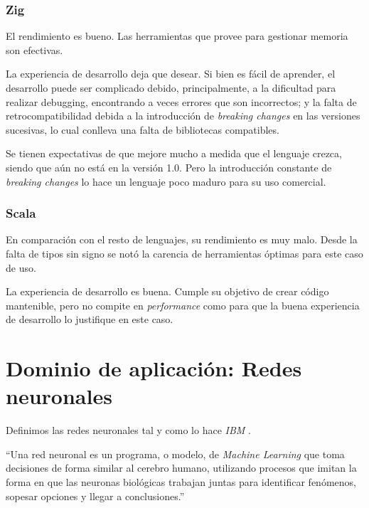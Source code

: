 \documentclass[11pt]{article}
\let\Oldsection\section
\renewcommand{\section}{\FloatBarrier\Oldsection}
\let\Oldsubsubsection\subsubsection
\renewcommand{\subsubsection}{\FloatBarrier\Oldsubsubsection}
\newcommand{\english}[1]{\textit{#1}}
\begin{document}
\subsubsection{Zig}

El rendimiento es bueno. Las herramientas que provee para gestionar memoria son efectivas.

La experiencia de desarrollo deja que desear. Si bien es fácil de aprender, el desarrollo puede ser complicado debido, principalmente, a la dificultad para realizar debugging, encontrando a veces errores que son incorrectos; y la falta de retrocompatibilidad debida a la introducción de \english{breaking changes} en las versiones sucesivas, lo cual conlleva una falta de bibliotecas compatibles. 

Se tienen expectativas de que mejore mucho a medida que el lenguaje crezca, siendo que aún no está en la versión 1.0. Pero la introducción constante de \english{breaking changes} lo hace un lenguaje poco maduro para su uso comercial.

\subsubsection{Scala}

En comparación con el resto de lenguajes, su rendimiento es muy malo. Desde la falta de tipos sin signo se notó la carencia de herramientas óptimas para este caso de uso.

La experiencia de desarrollo es buena. Cumple su objetivo de crear código mantenible, pero no compite en \english{performance} como para que la buena experiencia de desarrollo lo justifique en este caso.

\newpage

\section{Dominio de aplicación: Redes neuronales}

Definimos las redes neuronales tal y como lo hace \english{IBM} \cite{nn:definition}.

\begin{displayquote}
``Una red neuronal es un programa, o modelo, de \english{Machine Learning} que toma decisiones de forma similar al cerebro humano, utilizando procesos que imitan la forma en que las neuronas biológicas trabajan juntas para identificar fenómenos, sopesar opciones y llegar a conclusiones.''
\end{displayquote}
\end{document}
